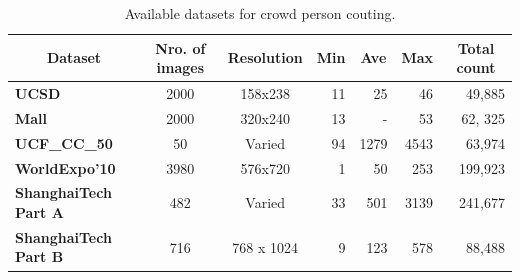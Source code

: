 \documentclass[10pt, a4paper]{article}
\begin{document}
\begin{table}[H]
\centering
\begin{tabular}{|l|c|c|r|r|r|r|}
\hline
\multicolumn{1}{|c|}{\textbf{Dataset}} & \textbf{Nro. of images} & \textbf{Resolution} & \multicolumn{1}{c|}{\textbf{Min}} & \multicolumn{1}{c|}{\textbf{Ave}} & \multicolumn{1}{c|}{\textbf{Max}} & \multicolumn{1}{c|}{\textbf{Total count}} \\ \hline
\textbf{UCSD} & 2000 & 158x238 & 11 & 25 & 46 & 49,885 \\ \hline
\textbf{Mall} & 2000 & 320x240 & 13 & - & 53 & 62, 325 \\ \hline
\textbf{UCF\_CC\_50} & 50 & Varied & 94 & 1279 & 4543 & 63,974 \\ \hline
\textbf{WorldExpo'10} & 3980 & 576x720 & 1 & 50 & 253 & 199,923 \\ \hline
\textbf{ShanghaiTech Part A} & 482 & Varied & 33 & 501 & 3139 & 241,677 \\ \hline
\textbf{ShanghaiTech Part B} & 716 & 768 x 1024 & 9 & 123 & 578 & 88,488 \\ \hline
\end{tabular}
\caption{Available datasets for crowd person couting.}
\label{table:datasets}
\end{table}



\end{document}
